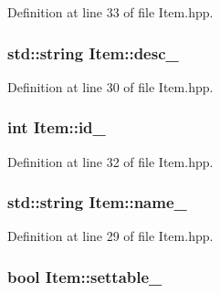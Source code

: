 Definition at line 33 of file Item.\-hpp.

\hypertarget{class_item_acf30d82ad77e65a0ff0b1f3f1efa8660}{
\subsubsection[{desc\-\_\-}]{\setlength{\rightskip}{0pt plus 5cm}std\-::string Item\-::desc\-\_\-\hspace{0.3cm}{\ttfamily [protected]}}}\label{class_item_acf30d82ad77e65a0ff0b1f3f1efa8660}


Definition at line 30 of file Item.\-hpp.

\hypertarget{class_item_acc4aa0295360f0b035b75cebfa81070a}{
\subsubsection[{id\-\_\-}]{\setlength{\rightskip}{0pt plus 5cm}int Item\-::id\-\_\-\hspace{0.3cm}{\ttfamily [protected]}}}\label{class_item_acc4aa0295360f0b035b75cebfa81070a}


Definition at line 32 of file Item.\-hpp.

\hypertarget{class_item_a5ea323338976e43c1b0e6030f641c9d2}{
\subsubsection[{name\-\_\-}]{\setlength{\rightskip}{0pt plus 5cm}std\-::string Item\-::name\-\_\-\hspace{0.3cm}{\ttfamily [protected]}}}\label{class_item_a5ea323338976e43c1b0e6030f641c9d2}


Definition at line 29 of file Item.\-hpp.

\hypertarget{class_item_aaca10d54d0fa6e1e090766b81c4a60c9}{
\subsubsection[{settable\-\_\-}]{\setlength{\rightskip}{0pt plus 5cm}bool Item\-::settable\-\_\-\hspace{0.3cm}{\ttfamily [protected]}}}\label{class_item_aaca10d54d0fa6e1e090766b81c4a60c9}


